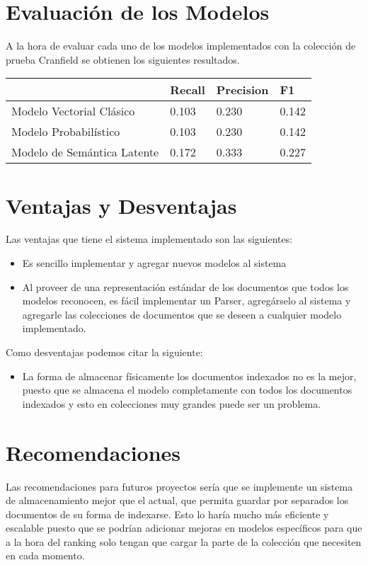 \documentclass[12pt]{article}
\begin{document}
\section{Evaluación de los Modelos}
A la hora de evaluar cada uno de los modelos implementados con la colección de prueba Cranfield
se obtienen los siguientes resultados.\newline

\begin{tabular}{|l|l|l|l|}
	\hline
	                            & Recall & Precision & F1    \\ \hline
	Modelo Vectorial Clásico    & 0.103  & 0.230     & 0.142 \\ \hline
	Modelo Probabilístico       & 0.103  & 0.230     & 0.142 \\ \hline
	Modelo de Semántica Latente & 0.172  & 0.333     & 0.227 \\ \hline
\end{tabular}

\section{Ventajas y Desventajas}
Las ventajas que tiene el sistema implementado son las siguientes:

\begin{itemize}
	\item Es sencillo implementar y agregar nuevos modelos al sistema
	\item Al proveer de una representación estándar de los documentos que todos los modelos
	      reconocen, es fácil implementar un Parser, agregárselo al sistema y agregarle las
	      colecciones de documentos que se deseen a cualquier modelo implementado.
\end{itemize}

Como desventajas podemos citar la siguiente:

\begin{itemize}
	\item La forma de almacenar físicamente los documentos indexados no es la mejor, puesto que
            se almacena el modelo completamente con todos los documentos indexados y esto en colecciones
            muy grandes puede ser un problema.
\end{itemize}

\section{Recomendaciones}
Las recomendaciones para futuros proyectos sería que se implemente un sistema de almacenamiento
mejor que el actual, que permita guardar por separados los documentos de su forma de indexarse. Esto
lo haría mucho más eficiente y escalable puesto que se podrían adicionar mejoras en modelos específicos
para que a la hora del ranking solo tengan que cargar la parte de la colección que necesiten en cada momento.
\end{document}

